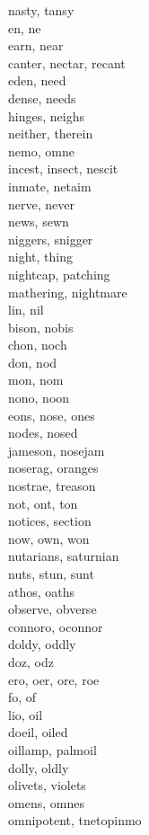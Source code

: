 nasty, tansy\\
en, ne\\
earn, near\\
canter, nectar, recant\\
eden, need\\
dense, needs\\
hinges, neighs\\
neither, therein\\
nemo, omne\\
incest, insect, nescit\\
inmate, netaim\\
nerve, never\\
news, sewn\\
niggers, snigger\\
night, thing\\
nightcap, patching\\
mathering, nightmare\\
lin, nil\\
bison, nobis\\
chon, noch\\
don, nod\\
mon, nom\\
nono, noon\\
eons, nose, ones\\
nodes, nosed\\
jameson, nosejam\\
noserag, oranges\\
nostrae, treason\\
not, ont, ton\\
notices, section\\
now, own, won\\
nutarians, saturnian\\
nuts, stun, sunt\\
athos, oaths\\
observe, obverse\\
connoro, oconnor\\
doldy, oddly\\
doz, odz\\
ero, oer, ore, roe\\
fo, of\\
lio, oil\\
doeil, oiled\\
oillamp, palmoil\\
dolly, oldly\\
olivets, violets\\
omens, omnes\\
omnipotent, tnetopinmo\\
